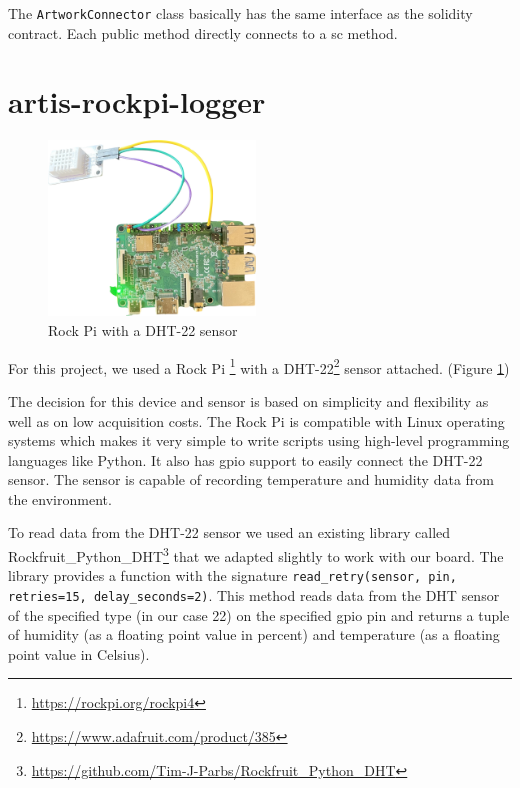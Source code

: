 The \texttt{ArtworkConnector} class basically has the same interface as the solidity contract. Each public method directly connects to a \gls{sc} method.



\clearpage
\section{artis-rockpi-logger}
\begin{figure}
    \centering
    \includegraphics[width=0.49\textwidth]{resources/rock-pi.png}
    \caption{Rock Pi with a DHT-22 sensor} 
    \label{fig:rock-pi}
\end{figure}
For this project, we used a Rock Pi \footnote{\href{https://rockpi.org/rockpi4}{https://rockpi.org/rockpi4}} with a DHT-22\footnote{\href{https://www.adafruit.com/product/385}{https://www.adafruit.com/product/385}} sensor attached. (Figure \ref{fig:rock-pi})

The decision for this device and sensor is based on simplicity and flexibility as well as on low acquisition costs. The Rock Pi is compatible with Linux operating systems which makes it very simple to write scripts using high-level programming languages like Python. It also has \gls{gpio} support to easily connect the DHT-22 sensor. The sensor is capable of recording temperature and humidity data from the environment.

To read data from the DHT-22 sensor we used an existing library called Rockfruit\_Python\_DHT\footnote{\href{https://github.com/Tim-J-Parbs/Rockfruit_Python_DHT}{https://github.com/Tim-J-Parbs/Rockfruit\_Python\_DHT}} that we adapted slightly to work with our board. The library provides a function with the signature \texttt{read\_retry(sensor, pin, retries=15, delay\_seconds=2)}. This method reads data from the DHT sensor of the specified type (in our case 22) on the specified \gls{gpio} pin and returns a tuple of humidity (as a floating point value in percent) and temperature (as a floating point value in Celsius). 

